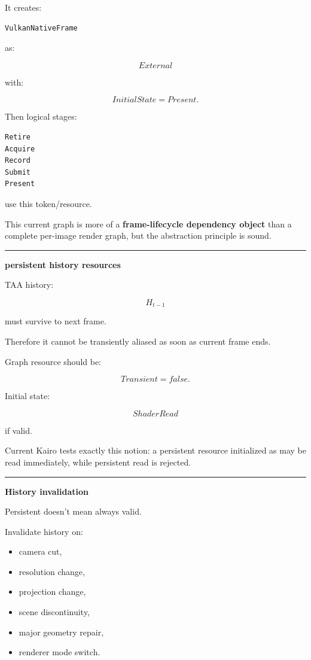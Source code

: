 It creates:

\begin{verbatim}
VulkanNativeFrame
\end{verbatim}

as:

\[
External
\]

with:

\[
InitialState=Present.
\]

Then logical stages:

\begin{verbatim}
Retire
Acquire
Record
Submit
Present
\end{verbatim}

use this token/resource.

This current graph is more of a \textbf{frame-lifecycle dependency object} than a complete per-image render graph, but the abstraction principle is sound.

\begin{center}\rule{0.5\linewidth}{0.5pt}\end{center}

\textbf{persistent history resources}

TAA history:

\[
H_{t-1}
\]

must survive to next frame.

Therefore it cannot be transiently aliased as soon as current frame ends.

Graph resource should be:

\[
Transient=false.
\]

Initial state:

\[
ShaderRead
\]

if valid.

Current Kairo tests exactly this notion: a persistent resource initialized as  may be read immediately, while persistent  read is rejected.

\begin{center}\rule{0.5\linewidth}{0.5pt}\end{center}

\textbf{History invalidation}

Persistent doesn't mean always valid.

Invalidate history on:

\begin{itemize}
\tightlist
\item
  camera cut,
\item
  resolution change,
\item
  projection change,
\item
  scene discontinuity,
\item
  major geometry repair,
\item
  renderer mode switch.
\end{itemize}

